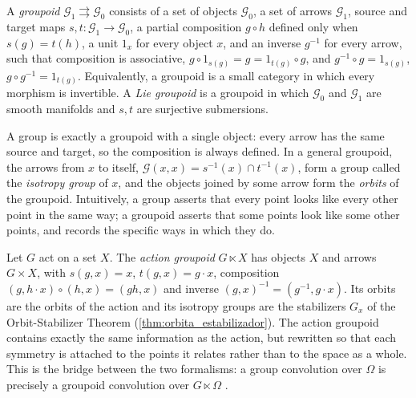 \begin{definition}[Groupoid]\label{def:grupoide}
A \textit{groupoid} $\mathcal{G}_1 \rightrightarrows \mathcal{G}_0$ consists of a set of objects $\mathcal{G}_0$, a set of arrows $\mathcal{G}_1$, source and target maps $s, t: \mathcal{G}_1 \to \mathcal{G}_0$, a partial composition $g \circ h$ defined only when $s(g) = t(h)$, a unit $1_x$ for every object $x$, and an inverse $g^{-1}$ for every arrow, such that composition is associative, $g \circ 1_{s(g)} = g = 1_{t(g)} \circ g$, and $g^{-1} \circ g = 1_{s(g)}$, $g \circ g^{-1} = 1_{t(g)}$. Equivalently, a groupoid is a small category in which every morphism is invertible. A \textit{Lie groupoid} is a groupoid in which $\mathcal{G}_0$ and $\mathcal{G}_1$ are smooth manifolds and $s, t$ are surjective submersions.
\end{definition}

A group is exactly a groupoid with a single object: every arrow has the same source and target, so the composition is always defined. In a general groupoid, the arrows from $x$ to itself, $\mathcal{G}(x,x) = s^{-1}(x) \cap t^{-1}(x)$, form a group called the \textit{isotropy group} of $x$, and the objects joined by some arrow form the \textit{orbits} of the groupoid. Intuitively, a group asserts that every point looks like every other point in the same way; a groupoid asserts that some points look like some other points, and records the specific ways in which they do.

\begin{example}\label{ex:grupoide_accion}
Let $G$ act on a set $X$. The \textit{action groupoid} $G \ltimes X$ has objects $X$ and arrows $G \times X$, with $s(g,x) = x$, $t(g,x) = g \cdot x$, composition $(g, h \cdot x) \circ (h, x) = (gh, x)$ and inverse $(g,x)^{-1} = (g^{-1}, g \cdot x)$. Its orbits are the orbits of the action and its isotropy groups are the stabilizers $G_x$ of the Orbit-Stabilizer Theorem (\autoref{thm:orbita_estabilizador}). The action groupoid contains exactly the same information as the action, but rewritten so that each symmetry is attached to the points it relates rather than to the space as a whole. This is the bridge between the two formalisms: a group convolution over $\Omega$ is precisely a groupoid convolution over $G \ltimes \Omega$ \citep{maruyama2025categorical}.
\end{example}


